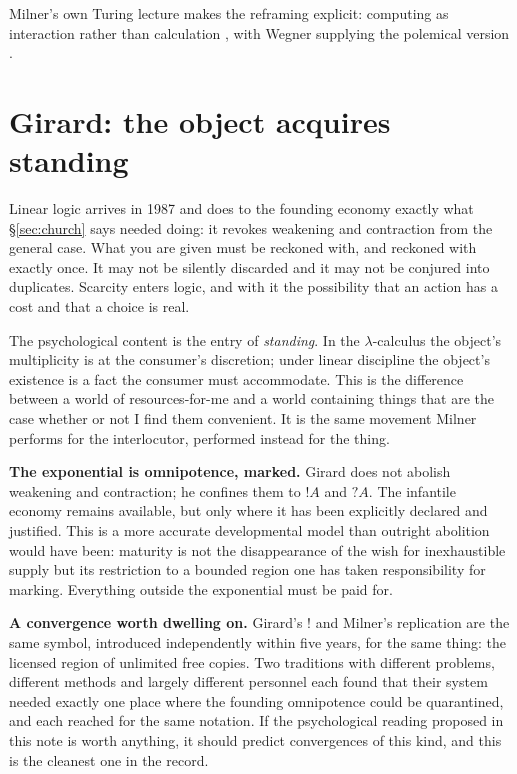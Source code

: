 \documentclass[11pt,a4paper]{article}
\begin{document}
Milner's own Turing lecture makes the reframing explicit: computing as interaction
rather than calculation \cite{milner1993}, with Wegner supplying the polemical
version \cite{wegner1997}.

\section{Girard: the object acquires standing}
\label{sec:girard}

Linear logic \cite{girard1987} arrives in 1987 and does to the founding economy
exactly what \S\ref{sec:church} says needed doing: it revokes weakening and
contraction from the general case. What you are given must be reckoned with, and
reckoned with exactly once. It may not be silently discarded and it may not be
conjured into duplicates. Scarcity enters logic, and with it the possibility that
an action has a cost and that a choice is real.

The psychological content is the entry of \emph{standing}. In the
$\lambda$-calculus the object's multiplicity is at the consumer's discretion;
under linear discipline the object's existence is a fact the consumer must
accommodate. This is the difference between a world of resources-for-me and a
world containing things that are the case whether or not I find them convenient.
It is the same movement Milner performs for the interlocutor, performed instead
for the thing.

\textbf{The exponential is omnipotence, marked.} Girard does not abolish
weakening and contraction; he confines them to $!A$ and $?A$. The infantile
economy remains available, but only where it has been explicitly declared and
justified. This is a more accurate developmental model than outright abolition
would have been: maturity is not the disappearance of the wish for inexhaustible
supply but its restriction to a bounded region one has taken responsibility for
marking. Everything outside the exponential must be paid for.

\textbf{A convergence worth dwelling on.} Girard's $!$ and Milner's replication
are the same symbol, introduced independently within five years, for the same
thing: the licensed region of unlimited free copies. Two traditions with
different problems, different methods and largely different personnel each found
that their system needed exactly one place where the founding omnipotence could
be quarantined, and each reached for the same notation. If the psychological
reading proposed in this note is worth anything, it should predict convergences
of this kind, and this is the cleanest one in the record.
\end{document}
